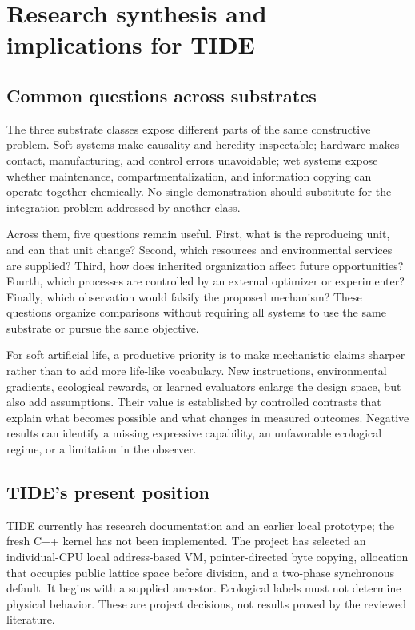 \section{Research synthesis and implications for TIDE}
\subsection{Common questions across substrates}
The three substrate classes expose different parts of the same constructive
problem. Soft systems make causality and heredity inspectable; hardware makes
contact, manufacturing, and control errors unavoidable; wet systems expose
whether maintenance, compartmentalization, and information copying can operate
together chemically. No single demonstration should substitute for the
integration problem addressed by another class.

Across them, five questions remain useful. First, what is the reproducing
unit, and can that unit change? Second, which resources and environmental
services are supplied? Third, how does inherited organization affect future
opportunities? Fourth, which processes are controlled by an external optimizer
or experimenter? Finally, which observation would falsify the proposed
mechanism? These questions organize comparisons without requiring all systems
to use the same substrate or pursue the same objective.

For soft artificial life, a productive priority is to make mechanistic claims
sharper rather than to add more life-like vocabulary. New instructions,
environmental gradients, ecological rewards, or learned evaluators enlarge
the design space, but also add assumptions. Their value is established by
controlled contrasts that explain what becomes possible and what changes in
measured outcomes. Negative results can identify a missing expressive
capability, an unfavorable ecological regime, or a limitation in the observer.

\subsection{TIDE's present position}
TIDE currently has research documentation and an earlier local prototype;
the fresh C++ kernel has not been implemented. The project has selected an
individual-CPU local address-based VM, pointer-directed byte copying,
allocation that occupies public lattice space before division, and a two-phase
synchronous default. It begins with a supplied ancestor. Ecological labels
must not determine physical behavior. These are project decisions, not results
proved by the reviewed literature.

